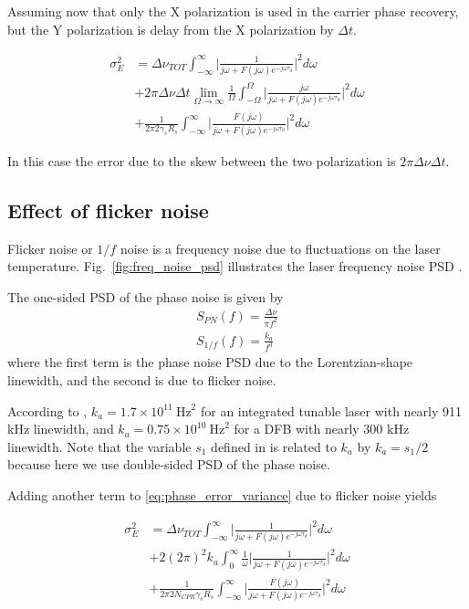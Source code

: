 \documentclass[a4paper]{article}
\begin{document}
Assuming now that only the X polarization is used in the carrier phase recovery, but the Y polarization is delay from the X polarization by $\Delta t$.

\begin{align} \nonumber
\sigma_E^2 &= \Delta\nu_{TOT}\int_{-\infty}^\infty \bigg|\frac{1}{j\omega +  F(j\omega)e^{-j\omega\tau_d}}\bigg|^2d\omega \\
& + 2\pi\Delta\nu\Delta t \lim_{\Omega\to\infty}\frac{1}{\Omega}\int_{-\Omega}^\Omega \bigg|\frac{j\omega}{j\omega +  F(j\omega)e^{-j\omega\tau_d}}\bigg|^2d\omega \\
&+ \frac{1}{2\pi 2\gamma_sR_s}\int_{-\infty}^\infty \bigg|\frac{F(j\omega)}{j\omega + F(j\omega)e^{-j\omega\tau_d}}\bigg|^2d\omega \nonumber
\end{align}

In this case the error due to the skew between the two polarization is $2\pi\Delta\nu\Delta t$.

\subsection{Effect of flicker noise}

Flicker noise or $1/f$ noise is a frequency noise due to fluctuations on the laser temperature. Fig.~\ref{fig:freq_noise_psd} illustrates the laser frequency noise PSD \cite{Kazovsky1986}.

The one-sided PSD of the phase noise is given by
\begin{align}
S_{PN}(f) = \frac{\Delta\nu}{\pi f^2} \\
S_{1/f}(f) = \frac{k_a}{f^3}
\end{align}
where the first term is the phase noise PSD due to the Lorentzian-shape linewidth, and the second is due to flicker noise.

According to \cite{Fatadin2013}, $k_a = 1.7\times 10^{11}~\mathrm{Hz}^2$ for an integrated tunable laser with nearly 911 kHz linewidth, and $k_a = 0.75\times 10^{10}~\mathrm{Hz}^2$ for a DFB with nearly 300 kHz linewidth. Note that the variable $s_1$ defined in \cite[equation (3)]{Fatadin2013} is related to $k_a$ by $k_a = s_1/2$ because here we use double-sided PSD of the phase noise.

Adding another term to \ref{eq:phase_error_variance} due to flicker noise yields

\begin{align} \label{eq:phase_error_variance_flicker} \nonumber
\sigma_E^2 &= \Delta\nu_{TOT}\int_{-\infty}^\infty \bigg|\frac{1}{j\omega + F(j\omega)e^{-j\omega\tau_d}}\bigg|^2d\omega \\ \nonumber
&+ 2(2\pi)^2 k_a\int_{0}^\infty \frac{1}{\omega}\bigg|\frac{1}{j\omega + F(j\omega)e^{-j\omega\tau_d}}\bigg|^2d\omega \\
&+ \frac{1}{2\pi 2N_{CPR}\gamma_sR_s}\int_{-\infty}^\infty \bigg|\frac{F(j\omega)}{j\omega + F(j\omega)e^{-j\omega\tau_d}}\bigg|^2d\omega 
\end{align}
\end{document}
